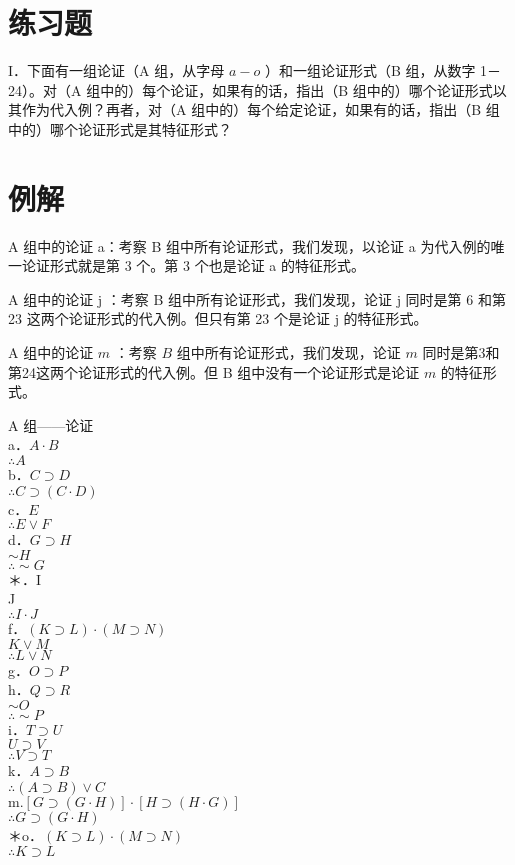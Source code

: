 \section*{练习题}
I．下面有一组论证（A 组，从字母 $a-o$ ）和一组论证形式（B 组，从数字 1－24）。对（A 组中的）每个论证，如果有的话，指出（B 组中的）哪个论证形式以其作为代入例？再者，对（A 组中的）每个给定论证，如果有的话，指出（B 组中的）哪个论证形式是其特征形式？

\section*{例解}
A 组中的论证 a：考察 B 组中所有论证形式，我们发现，以论证 a 为代入例的唯一论证形式就是第 3 个。第 3 个也是论证 a 的特征形式。

A 组中的论证 j ：考察 B 组中所有论证形式，我们发现，论证 j 同时是第 6 和第 23 这两个论证形式的代入例。但只有第 23 个是论证 j 的特征形式。

A 组中的论证 $m$ ：考察 $B$ 组中所有论证形式，我们发现，论证 $m$ 同时是第3和第24这两个论证形式的代入例。但 B 组中没有一个论证形式是论证 $m$ 的特征形式。

A 组——论证\\
a．$A \cdot B$\\
$\therefore A$\\
b．$C \supset D$\\
$\therefore C \supset(C \cdot D)$\\
c．$E$\\
$\therefore E \vee F$\\
d．$G \supset H$\\
$\sim H$\\
$\therefore \sim G$\\
＊．I\\
J\\
$\therefore I \cdot J$\\
f．$(K \supset L) \cdot(M \supset N)$\\
$K \vee M$\\
$\therefore L \vee N$\\
g．$O \supset P$\\
h．$Q \supset R$\\
$\sim O$\\
$\therefore \sim P$\\
i．$T \supset U$\\
$U \supset V$\\
$\therefore V \supset T$\\
k．$A \supset B$\\
$\therefore(A \supset B) \vee C$\\
$\mathrm{m} .[G \supset(G \cdot H)] \cdot[H \supset(H \cdot G)]$\\
$\therefore G \supset(G \cdot H)$\\
＊o．$(K \supset L) \cdot(M \supset N)$\\
$\therefore K \supset L$

